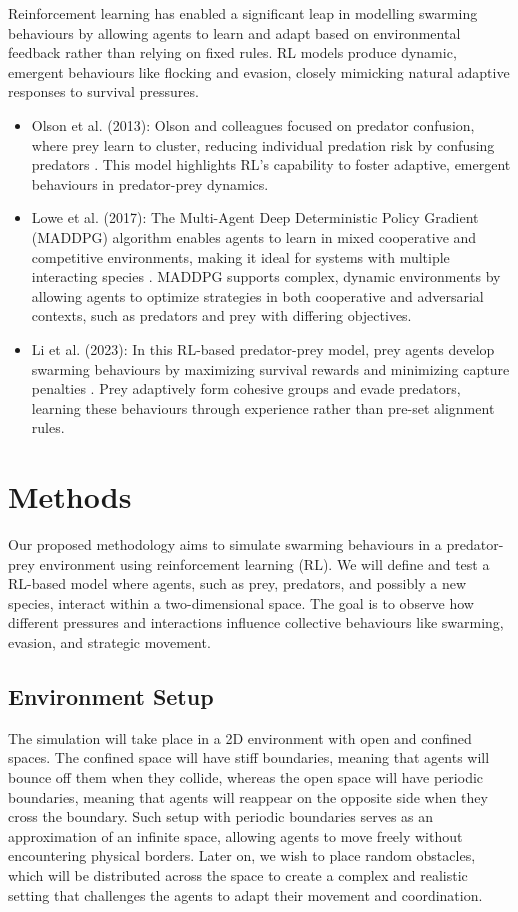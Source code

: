 \documentclass[9pt]{pnas-new}
\begin{document}
Reinforcement learning has enabled a significant leap in modelling swarming behaviours by allowing agents to learn and adapt based on environmental feedback rather than relying on fixed rules. RL models produce dynamic, emergent behaviours like flocking and evasion, closely mimicking natural adaptive responses to survival pressures.

\begin{itemize}
    \item Olson et al. (2013): Olson and colleagues focused on predator confusion, where prey learn to cluster, reducing individual predation risk by confusing predators \cite{olson2013predator}. This model highlights RL's capability to foster adaptive, emergent behaviours in predator-prey dynamics.
    \item Lowe et al. (2017): The Multi-Agent Deep Deterministic Policy Gradient (MADDPG) algorithm enables agents to learn in mixed cooperative and competitive environments, making it ideal for systems with multiple interacting species \cite{lowe2017}. MADDPG supports complex, dynamic environments by allowing agents to optimize strategies in both cooperative and adversarial contexts, such as predators and prey with differing objectives.
    \item Li et al. (2023): In this RL-based predator-prey model, prey agents develop swarming behaviours by maximizing survival rewards and minimizing capture penalties \cite{li2023predator}. Prey adaptively form cohesive groups and evade predators, learning these behaviours through experience rather than pre-set alignment rules.
\end{itemize}


\section*{Methods}

Our proposed methodology aims to simulate swarming behaviours in a predator-prey environment using reinforcement learning (RL). We will define and test a RL-based model where agents, such as prey, predators, and possibly a new species, interact within a two-dimensional space. The goal is to observe how different pressures and interactions influence collective behaviours like swarming, evasion, and strategic movement.

\subsection{Environment Setup}
The simulation will take place in a 2D environment with open and confined spaces. The confined space will have stiff boundaries, meaning
that agents will bounce off them when they collide, whereas the open space will have periodic boundaries, meaning that agents will reappear on the opposite side when they cross the boundary.
Such setup with periodic boundaries serves as an approximation of an infinite space, allowing agents to move freely without encountering physical borders. 
Later on, we wish to place random obstacles, which will be distributed across the space to create a complex and realistic setting that challenges the agents to adapt their movement and coordination. 
\end{document}
